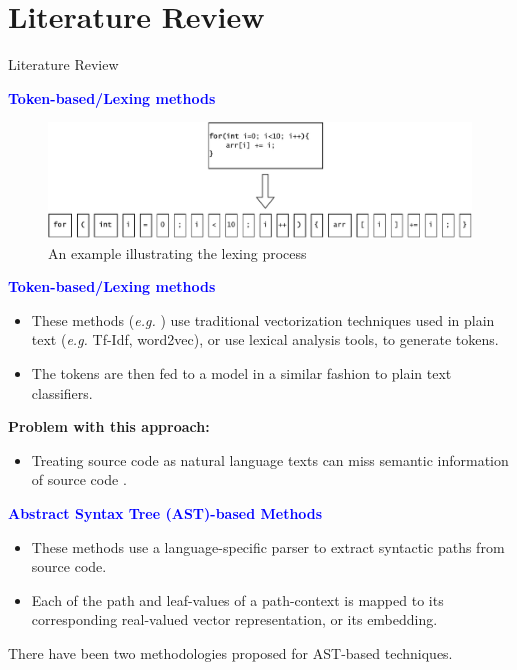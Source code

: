 \section{Literature Review}
\begin{frame}[allowframebreaks]{Literature Review}

\textcolor{blue}{\textbf{Token-based/Lexing methods}}
\begin{figure}[h]
    \centering
    \includegraphics[width=0.8\linewidth]{images/lex.pdf}
    \caption{An example illustrating the lexing process \cite{hareretal2018}}
    \label{fig:token-based}
\end{figure}
\framebreak

\textcolor{blue}{\textbf{Token-based/Lexing methods}}
\medskip
\begin{itemize}
    \item These methods (\textit{e.g.} \cite{hareretal2018,cambronero2019deep,suman2020source}) use traditional vectorization techniques used in plain text (\textit{e.g.} Tf-Idf, word2vec), or use lexical analysis tools, to generate tokens.
    \item The tokens are then fed to a model in a similar fashion to plain text classifiers.
\end{itemize}
\medskip
\textbf{Problem with this approach:}
\begin{itemize}
    \item Treating source code as natural language texts can miss semantic information of source code \cite{zhang2019novel}.
\end{itemize}
\framebreak

\textcolor{blue}{\textbf{Abstract Syntax Tree (AST)-based Methods}}
\medskip
\begin{itemize}
    \item These methods use a language-specific parser to extract syntactic paths from source code.
    \item Each of the path and leaf-values of a path-context is mapped to its corresponding real-valued vector representation, or its embedding.
\end{itemize}
\medskip
\par There have been two methodologies proposed for AST-based techniques.
\framebreak


\end{frame}
